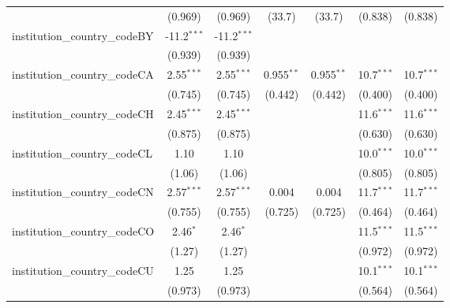 \begin{tabular}{lcccccc}
                                         & (0.969)        & (0.969)        & (33.7)        & (33.7)        & (0.838)       & (0.838)\\   
   institution\_country\_codeBY          & -11.2$^{***}$  & -11.2$^{***}$  &               &               &               &   \\   
                                         & (0.939)        & (0.939)        &               &               &               &   \\   
   institution\_country\_codeCA          & 2.55$^{***}$   & 2.55$^{***}$   & 0.955$^{**}$  & 0.955$^{**}$  & 10.7$^{***}$  & 10.7$^{***}$\\   
                                         & (0.745)        & (0.745)        & (0.442)       & (0.442)       & (0.400)       & (0.400)\\   
   institution\_country\_codeCH          & 2.45$^{***}$   & 2.45$^{***}$   &               &               & 11.6$^{***}$  & 11.6$^{***}$\\   
                                         & (0.875)        & (0.875)        &               &               & (0.630)       & (0.630)\\   
   institution\_country\_codeCL          & 1.10           & 1.10           &               &               & 10.0$^{***}$  & 10.0$^{***}$\\   
                                         & (1.06)         & (1.06)         &               &               & (0.805)       & (0.805)\\   
   institution\_country\_codeCN          & 2.57$^{***}$   & 2.57$^{***}$   & 0.004         & 0.004         & 11.7$^{***}$  & 11.7$^{***}$\\   
                                         & (0.755)        & (0.755)        & (0.725)       & (0.725)       & (0.464)       & (0.464)\\   
   institution\_country\_codeCO          & 2.46$^{*}$     & 2.46$^{*}$     &               &               & 11.5$^{***}$  & 11.5$^{***}$\\   
                                         & (1.27)         & (1.27)         &               &               & (0.972)       & (0.972)\\   
   institution\_country\_codeCU          & 1.25           & 1.25           &               &               & 10.1$^{***}$  & 10.1$^{***}$\\   
                                         & (0.973)        & (0.973)        &               &               & (0.564)       & (0.564)\\   

\end{tabular}
